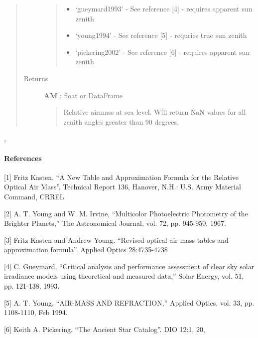 \documentclass[letterpaper,10pt,english]{sphinxmanual}
\begin{document}
\begin{fulllineitems}
\begin{quote}
\begin{description}
\begin{quote}
\begin{itemize}
\item {} 
`gueymard1993' - See reference {[}4{]} - requires apparent sun zenith

\item {} 
`young1994' - See reference {[}5{]} - requries true sun zenith

\item {} 
`pickering2002' - See reference {[}6{]} - requires apparent sun zenith

\end{itemize}
\end{quote}

\item[{Returns}] \leavevmode
\textbf{AM} : float or DataFrame
\begin{quote}

Relative airmass at sea level.  Will return NaN values for all zenith 
angles greater than 90 degrees.
\end{quote}

\end{description}\end{quote}




{\hyperref[stubs/pvlib.pvl_absoluteairmass:pvlib.pvl_absoluteairmass]{}}, {\hyperref[stubs/pvlib.pvl_ephemeris:pvlib.pvl_ephemeris]{}}


\paragraph{References}

{[}1{]} Fritz Kasten. ``A New Table and Approximation Formula for the
Relative Optical Air Mass''. Technical Report 136, Hanover, N.H.: U.S.
Army Material Command, CRREL.

{[}2{]} A. T. Young and W. M. Irvine, ``Multicolor Photoelectric Photometry
of the Brighter Planets,'' The Astronomical Journal, vol. 72, 
pp. 945-950, 1967.

{[}3{]} Fritz Kasten and Andrew Young. ``Revised optical air mass tables and
approximation formula''. Applied Optics 28:4735-4738

{[}4{]} C. Gueymard, ``Critical analysis and performance assessment of 
clear sky solar irradiance models using theoretical and measured data,''
Solar Energy, vol. 51, pp. 121-138, 1993.

{[}5{]} A. T. Young, ``AIR-MASS AND REFRACTION,'' Applied Optics, vol. 33, 
pp. 1108-1110, Feb 1994.

{[}6{]} Keith A. Pickering. ``The Ancient Star Catalog''. DIO 12:1, 20,

\end{fulllineitems}
\end{document}
